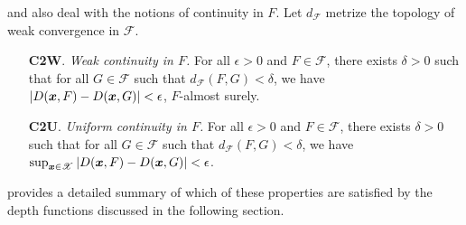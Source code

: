 \textcite{reyes-battey-2016} and \textcite{gijbels-nagy-2017} also deal with
the notions of continuity in $F$.
Let $d_{\mathscr{F}}$ metrize the topology of weak convergence in
$\mathscr{F}$.
\begin{enumerate}
    \item[\textbf{C2W}.] \emph{Weak continuity in $F$.}
    For all $\epsilon > 0$ and $F \in \mathscr{F}$, there exists $\delta > 0$
    such that for all $G \in \mathscr{F}$ such that $d_{\mathscr{F}}(F, G) <
    \delta$, we have $|D(\bm{x}, F) - D(\bm{x}, G)| < \epsilon$, $F$-almost surely.

    \item[\textbf{C2U}.] \emph{Uniform continuity in $F$.}
    For all $\epsilon > 0$ and $F \in \mathscr{F}$, there exists $\delta > 0$
    such that for all $G \in \mathscr{F}$ such that $d_{\mathscr{F}}(F, G) <
    \delta$, we have $\sup_{\bm{x} \in \mathscr{X}} |D(\bm{x}, F) - D(\bm{x}, G)| <
    \epsilon$.
\end{enumerate}


\textcite[Table 1]{gijbels-nagy-2017} provides a detailed summary of which of
these properties are satisfied by the depth functions discussed in the
following section.










